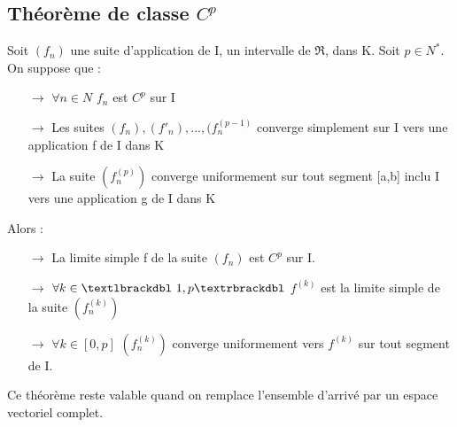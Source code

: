 \subsection{Théorème de classe $C^p$}
\begin{theo}
Soit $(f_n)$ une suite d'application de I, un intervalle de $\Re$, dans K. Soit $p \in N^*$.\\
On suppose que : \\
\begin{itemize}
 \item[$\rightarrow$] $\forall n \in N$ $f_n$ est $C^p$ sur I
 \item[$\rightarrow$] Les suites $(f_n),(f'_n),...,(f_n^{(p-1)}$ converge simplement sur I vers une application f de I dans K
 \item[$\rightarrow$] La suite $(f_n^{(p)})$ converge uniformement sur tout segment [a,b] inclu I vers une application g de I dans K
\end{itemize}
Alors : \\
\begin{itemize}
 \item[$\rightarrow$] La limite simple f de la suite $(f_n)$ est $C^p$ sur I.
 \item[$\rightarrow$] $\forall k \in \textlbrackdbl\ 1,p \textrbrackdbl$ $f^{(k)}$ est la limite simple de la suite $(f_n^{(k)})$
 \item[$\rightarrow$] $\forall k \in \left[0,p\right]$ $(f_n^{(k)})$ converge uniformement vers $f^{(k)}$ sur tout segment de I.
\end{itemize}
\end{theo}
\begin{gene}
Ce théorème reste valable quand on remplace l'ensemble d'arrivé par un espace vectoriel complet.
\end{gene}
